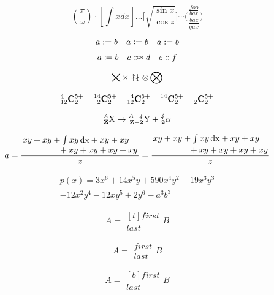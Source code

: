 \documentclass{article}
\newcommand{\horz}{\noindent\makebox[\linewidth]{\rule{\paperwidth}{0.4pt}}}
\begin{document}
\horz

\[
\left( \frac{\pi}{\omega} \right) \cdot \left[ \int x dx \right] \ldots \lbrack \sqrt{\frac{\sin x}{\cos z}} \rbrack \cdots \lparen \frac{\frac{foo}{bar}}{\frac{baz}{qux}} \rparen
\]

\horz

\[
a := b \quad
a \vcentcolon= b \quad
a \ordinarycolon= b
\]

\[
a \coloneqq b \quad c \Colonapprox d \quad e \dblcolon f
\]

\[
\bigtimes \times \nuparrow \ndownarrow \otimes \bigotimes
\]

\horz

\[
{}^{4}_{12}\mathbf{C}^{5+}_{2} \quad
\prescript{14}{2}{\mathbf{C}}^{5+}_{2} \quad
\prescript{4}{12}{\mathbf{C}}^{5+}_{2} \quad
\prescript{14}{}{\mathbf{C}}^{5+}_{2} \quad
\prescript{}{2}{\mathbf{C}}^{5+}_{2}
\]

\newcommand*\myisotope[3]{%
\begingroup %
\mathtoolsset{
prescript-sup-format=\mathit,
prescript-sub-format=\mathbf,
prescript-arg-format=\mathrm,
}%
\prescript{#1}{#2}{#3}%
\endgroup
}
\[
\myisotope{A}{Z}{X}\to \myisotope{A-4}{Z-2}{Y}+
\myisotope{4}{2}{\alpha}
\]

\horz

\[
    a=\frac{
        \splitfrac{xy + xy + \int xy\, \text{dx} + xy + xy}
                  {+ xy + xy + xy + xy}
      }
      {z}
    =\frac{
        \splitdfrac{xy + xy + \int xy\, \text{dx} + xy + xy}
                   {+ xy + xy + xy + xy}
      }
      {z}
\]

\horz

\begin{multline*}
p(x) = 3x^6 + 14x^5y + 590x^4y^2 + 19x^3y^3\\
- 12x^2y^4 - 12xy^5 + 2y^6 - a^3b^3
\end{multline*}

\[
A = \begin{multlined}[t]
\boxed{first} \\
\boxed{last}
\end{multlined} B
\]

\[
A = \begin{multlined}
\boxed{first} \\
\boxed{last}
\end{multlined} B
\]

\[
A = \begin{multlined}[b]
\boxed{first} \\
\boxed{last}
\end{multlined} B
\]
\end{document}
